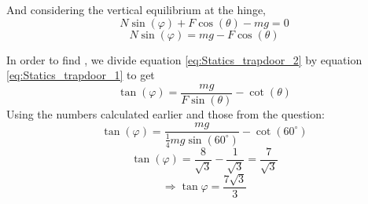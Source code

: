 \begin{problem}[AS1989AddPQ1p]
{And considering the vertical equilibrium at the hinge,
\begin{equation*}
N\sin(\varphi)+F\cos(\theta)-mg=0	
\end{equation*}
\begin{equation}
N\sin(\varphi)=mg-F\cos(\theta)	\label{eq:Statics_trapdoor_2}
\end{equation}

In order to find \vari{\varphi}, we divide equation \ref{eq:Statics_trapdoor_2} by equation \ref{eq:Statics_trapdoor_1} to get
\begin{equation*}
\tan(\varphi)=\frac{mg}{F\sin(\theta)}-\cot(\theta)	
\end{equation*}	
Using the numbers calculated earlier and those from the question:
\begin{equation*}
\tan(\varphi)=\frac{mg}{\frac{1}{4}mg\sin(60^\circ)}-\cot(60^\circ)	
\end{equation*}	
\begin{equation*}
\tan(\varphi)=\frac{8}{\sqrt{3}}-\frac{1}{\sqrt{3}}=\frac{7}{\sqrt{3}}	
\end{equation*}	
\begin{equation*} 
\Rightarrow \tan{\varphi} = \frac{7\sqrt{3}}{3}	
\end{equation*}
}
\end{problem}